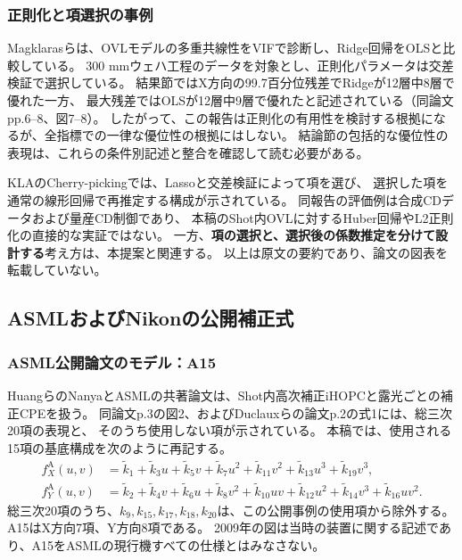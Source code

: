 \documentclass[11pt,a4paper]{ltjsarticle}
\begin{document}
\subsubsection{正則化と項選択の事例}
Magklarasらは、OVLモデルの多重共線性をVIFで診断し、Ridge回帰をOLSと比較している\cite{magklaras2024}。
300 mmウェハ工程のデータを対象とし、正則化パラメータは交差検証で選択している。
結果節ではX方向の99.7百分位残差でRidgeが12層中8層で優れた一方、
最大残差ではOLSが12層中9層で優れたと記述されている（同論文pp.6--8、図7--8）。
したがって、この報告は正則化の有用性を検討する根拠になるが、全指標での一律な優位性の根拠にはしない。
結論節の包括的な優位性の表現は、これらの条件別記述と整合を確認して読む必要がある。

KLAのCherry-pickingでは、Lassoと交差検証によって項を選び、
選択した項を通常の線形回帰で再推定する構成が示されている\cite{cherry2025}。
同報告の評価例は合成CDデータおよび量産CD制御であり、
本稿のShot内OVLに対するHuber回帰やL2正則化の直接的な実証ではない。
一方、\textbf{項の選択と、選択後の係数推定を分けて設計する}考え方は、本提案と関連する。
以上は原文の要約であり、論文の図表を転載していない。

\subsection{ASMLおよびNikonの公開補正式}
\subsubsection{ASML公開論文のモデル：A15}
HuangらのNanyaとASMLの共著論文は、Shot内高次補正iHOPCと露光ごとの補正CPEを扱う\cite{huang2009}。
同論文p.3の図2、およびDuclauxらの論文p.2の式1には、総三次20項の表現と、
そのうち使用しない項が示されている\cite{nicolas2020}。
本稿では、使用される15項の基底構成を次のように再記する。
\begin{align}
 f_X^{\mathrm A}(u,v)
 &=\widetilde k_1+\widetilde k_3u+\widetilde k_5v
   +\widetilde k_7u^2+\widetilde k_{11}v^2
   +\widetilde k_{13}u^3+\widetilde k_{19}v^3,\label{eq:asml-x}\\
 f_Y^{\mathrm A}(u,v)
 &=\widetilde k_2+\widetilde k_4v+\widetilde k_6u
   +\widetilde k_8v^2+\widetilde k_{10}uv+\widetilde k_{12}u^2
   +\widetilde k_{14}v^3+\widetilde k_{16}uv^2.\label{eq:asml-y}
\end{align}
総三次20項のうち、$k_9,k_{15},k_{17},k_{18},k_{20}$は、この公開事例の使用項から除外する。
A15はX方向7項、Y方向8項である。
2009年の図は当時の装置に関する記述であり、A15をASMLの現行機すべての仕様とはみなさない。
\end{document}
